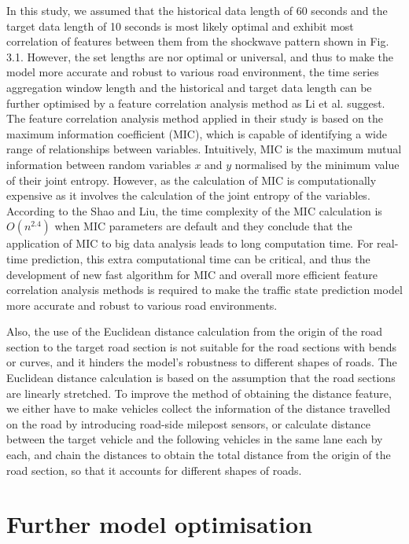 \documentclass[11pt]{uonthesis}
\begin{document}
In this study, we assumed that the historical data length of 60 seconds and the target data length of 10 seconds is most likely optimal and exhibit most correlation of features between them from the shockwave pattern shown in Fig. 3.1. %
However, the set lengths are nor optimal or universal, and thus to make the model more accurate and robust to various road environment, the time series aggregation window length and the historical and target data length can be further optimised by a feature correlation analysis method as Li et al.\cite{9284587} suggest. The feature correlation analysis method applied in their study is based on the maximum information coefficient (MIC), which is capable of identifying a wide range of relationships between variables\cite{mic}. %
Intuitively, MIC is the maximum mutual information between random variables $x$ and $y$ normalised by the minimum value of their joint entropy. However, as the calculation of MIC is computationally expensive as it involves the calculation of the joint entropy of the variables. According to the Shao and Liu\cite{miccomplexity}, the time complexity of the MIC calculation is $O(n^{2.4})$ when MIC parameters are default and they conclude that the application of MIC to big data analysis leads to long computation time. For real-time prediction, this extra computational time can be critical, and thus the development of new fast algorithm for MIC and overall more efficient feature correlation analysis methods is required to make the traffic state prediction model more accurate and robust to various road environments.

Also, the use of the Euclidean distance calculation from the origin of the road section to the target road section is not suitable for the road sections with bends or curves, and it hinders the model's robustness to different shapes of roads. The Euclidean distance calculation is based on the assumption that the road sections are linearly stretched. To improve the method of obtaining the distance feature, we either have to make vehicles collect the information of the distance travelled on the road by introducing road-side milepost sensors, or calculate distance between the target vehicle and the following vehicles in the same lane each by each, and chain the distances to obtain the total distance from the origin of the road section, so that it accounts for different shapes of roads.

\section{Further model optimisation}
\end{document}
